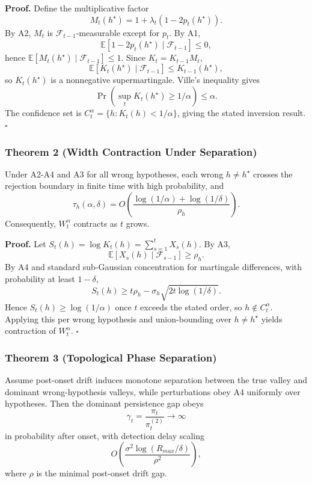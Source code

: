 \documentclass[
]{article}
\begin{document}
\textbf{Proof.} Define the multiplicative factor \[
M_t(h^\star)=1+\lambda_t(1-2p_t(h^\star)).
\] By A2, \(M_t\) is \(\mathcal F_{t-1}\)-measurable except for \(p_t\).
By A1, \[
\mathbb E[1-2p_t(h^\star)\mid\mathcal F_{t-1}] \le 0,
\] hence \(\mathbb E[M_t(h^\star)\mid\mathcal F_{t-1}]\le 1\). Since
\(K_t=K_{t-1}M_t\), \[
\mathbb E[K_t(h^\star)\mid\mathcal F_{t-1}] \le K_{t-1}(h^\star),
\] so \(K_t(h^\star)\) is a nonnegative supermartingale. Ville's
inequality gives \[
\Pr\!\left(\sup_t K_t(h^\star)\ge 1/\alpha\right)\le \alpha.
\] The confidence set is \(C_t^\alpha=\{h:K_t(h)<1/\alpha\}\), giving
the stated inversion result. \(\square\)

\subsubsection{Theorem 2 (Width Contraction Under
Separation)}\label{theorem-2-width-contraction-under-separation}

Under A2-A4 and A3 for all wrong hypotheses, each wrong
\(h\neq h^\star\) crosses the rejection boundary in finite time with
high probability, and \[
\tau_h(\alpha,\delta)=O\!\left(\frac{\log(1/\alpha)+\log(1/\delta)}{\rho_h}\right).
\] Consequently, \(W_t^\alpha\) contracts as \(t\) grows.

\textbf{Proof.} Let \(S_t(h)=\log K_t(h)=\sum_{s=1}^t X_s(h)\). By A3,
\[
\mathbb E[X_s(h)\mid\mathcal F_{s-1}] \ge \rho_h.
\] By A4 and standard sub-Gaussian concentration for martingale
differences, with probability at least \(1-\delta\), \[
S_t(h)\ge t\rho_h-\sigma_h\sqrt{2t\log(1/\delta)}.
\] Hence \(S_t(h)\ge \log(1/\alpha)\) once \(t\) exceeds the stated
order, so \(h\notin C_t^\alpha\). Applying this per wrong hypothesis and
union-bounding over \(h\neq h^\star\) yields contraction of
\(W_t^\alpha\). \(\square\)

\subsubsection{Theorem 3 (Topological Phase
Separation)}\label{theorem-3-topological-phase-separation}

Assume post-onset drift induces monotone separation between the true
valley and dominant wrong-hypothesis valleys, while perturbations obey
A4 uniformly over hypotheses. Then the dominant persistence gap obeys \[
\gamma_t=\frac{\pi_t}{\pi_t^{(2)}} \to \infty
\] in probability after onset, with detection delay scaling \[
O\!\left(\frac{\sigma^2\log(R_{max}/\delta)}{\rho^2}\right),
\] where \(\rho\) is the minimal post-onset drift gap.
\end{document}
